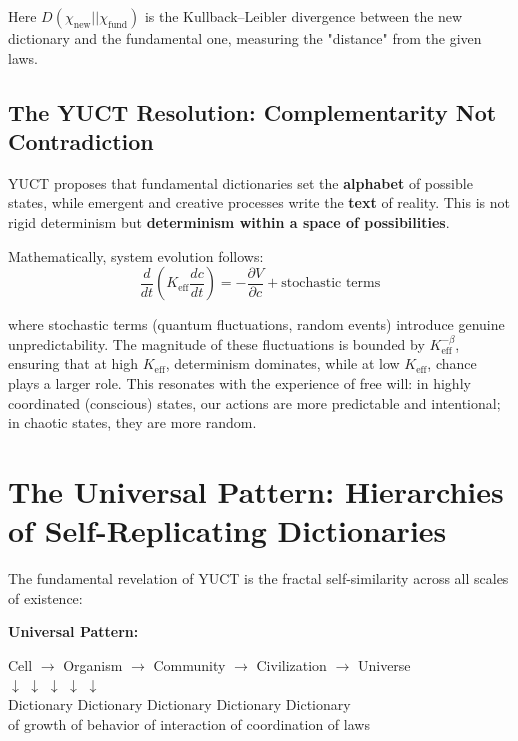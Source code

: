 \documentclass[12pt,a4paper]{article}
\newcommand{\eff}{\mathrm{eff}}
\newcommand{\Ke}{K_{\eff}}
\begin{document}
	Here $D(\chi_{\text{new}} || \chi_{\text{fund}})$ is the Kullback–Leibler divergence between the new dictionary and the fundamental one, measuring the "distance" from the given laws.
	
	\subsection{The YUCT Resolution: Complementarity Not Contradiction}
	
	YUCT proposes that fundamental dictionaries set the \textbf{alphabet} of possible states, while emergent and creative processes write the \textbf{text} of reality. This is not rigid determinism but \textbf{determinism within a space of possibilities}.
	
	Mathematically, system evolution follows:
	\[
	\frac{d}{dt}\left( \Ke \frac{dc}{dt} \right) = -\frac{\partial V}{\partial c} + \text{stochastic terms}
	\]
	
	where stochastic terms (quantum fluctuations, random events) introduce genuine unpredictability. The magnitude of these fluctuations is bounded by $\Ke^{-\beta}$, ensuring that at high $\Ke$, determinism dominates, while at low $\Ke$, chance plays a larger role. This resonates with the experience of free will: in highly coordinated (conscious) states, our actions are more predictable and intentional; in chaotic states, they are more random.
	
	\section{The Universal Pattern: Hierarchies of Self-Replicating Dictionaries}
	
	The fundamental revelation of YUCT is the fractal self-similarity across all scales of existence:
	
	\textbf{Universal Pattern:}
	\begin{center}
		Cell $\to$ Organism $\to$ Community $\to$ Civilization $\to$ Universe\\
		$\downarrow$ \hspace{1cm} $\downarrow$ \hspace{1.2cm} $\downarrow$ \hspace{1.2cm} $\downarrow$ \hspace{1.2cm} $\downarrow$\\
		Dictionary\hspace{0.5cm} Dictionary\hspace{0.5cm} Dictionary\hspace{0.5cm} Dictionary\hspace{0.5cm} Dictionary\\
		of growth\hspace{0.2cm} of behavior\hspace{0.1cm} of interaction\hspace{0.1cm} of coordination\hspace{0.1cm} of laws
	\end{center}
	
\end{document}
